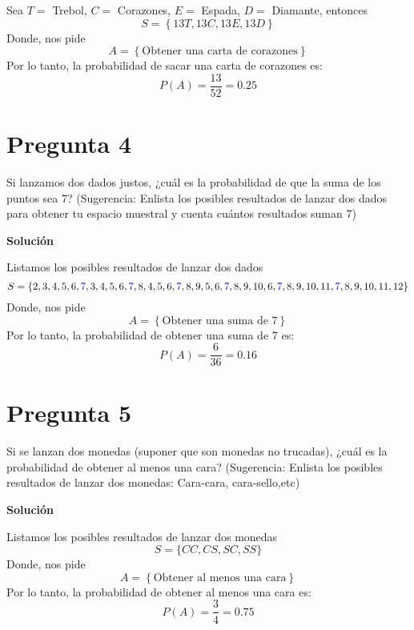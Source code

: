 \documentclass[11pt]{article}
\begin{document}
	Sea $T =$ Trebol, $C =$ Corazones, $E=$ Espada, $D=$ Diamante, entonces
	\begin{equation}
		S = \left\{  13T, 13C, 13E, 13D \right\}
	\end{equation}
	Donde, nos pide 
	\begin{equation}
		A = \left\{ \text{Obtener una carta de corazones} \right\}
	\end{equation}
	Por lo tanto, la probabilidad de sacar una carta de corazones es:
	\begin{equation}
		P(A ) = \dfrac{13}{52} = 0.25
	\end{equation}
	
	\section{Pregunta 4}
	Si lanzamos dos dados justos, ¿cuál es la probabilidad de que la suma de los puntos sea 7? (Sugerencia: Enlista los posibles resultados de lanzar dos dados para obtener tu espacio muestral y cuenta cuántos resultados suman 7)
		\begin{center}
			\textbf{Solución}
		\end{center}
	Listamos los posibles resultados de lanzar dos dados 
		\begin{equation}
			S = \{ 2, 3, 4, 5, 6, \textcolor{blue}{7}, 3, 4, 5, 6, \textcolor{blue}{7}, 8, 4, 5, 6, \textcolor{blue}{7}, 8, 9, 5,  6, \textcolor{blue}{7}, 8, 9, 10, 6, \textcolor{blue}{7}, 8, 9, 10, 11, \textcolor{blue}{7}, 8, 9, 10, 11, 12  \}
		\end{equation}
	Donde, nos pide 
	\begin{equation}
		A = \left\{ \text{Obtener una suma de 7} \right\}
	\end{equation}
	Por lo tanto, la probabilidad de obtener una suma de 7 es:
	\begin{equation}
		P(A ) = \dfrac{6}{36} = 0.16
	\end{equation}

	\section{Pregunta 5}
	Si se lanzan dos monedas (suponer que son monedas no trucadas), ¿cuál es la probabilidad de obtener al menos una cara? (Sugerencia: Enlista los posibles resultados de lanzar dos monedas: Cara-cara, cara-sello,etc)
		\begin{center}
			\textbf{Solución}
		\end{center}
    Listamos los posibles resultados de lanzar dos monedas
		\begin{equation}
			S = \{ CC, CS, SC, SS \}
		\end{equation}
	Donde,  nos pide 
	\begin{equation}
		A = \left\{ \text{Obtener al menos una cara} \right\}
	\end{equation}
	Por lo tanto, la probabilidad de obtener al menos una cara es:
	\begin{equation}
		P(A ) = \dfrac{3}{4} = 0.75
	\end{equation}
\end{document}
